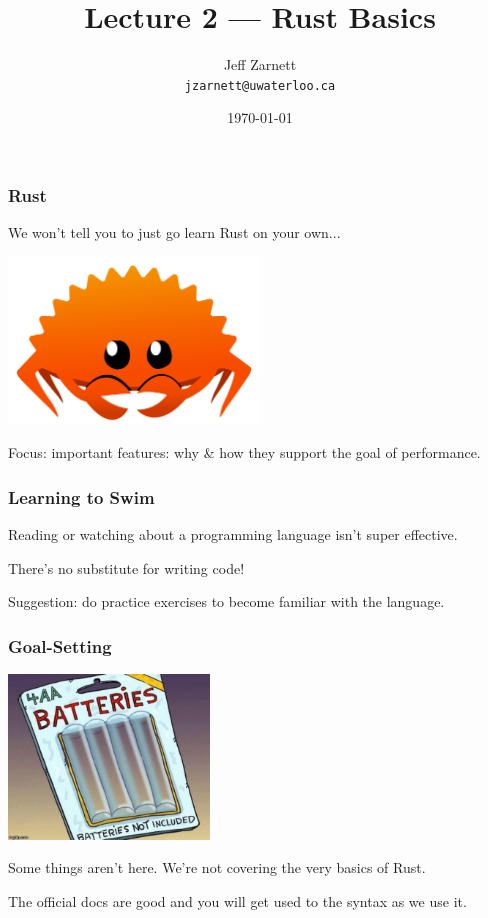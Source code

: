


\title{Lecture 2 --- Rust Basics }

\author{Jeff Zarnett \\ \small \texttt{jzarnett@uwaterloo.ca}}
\date{\today}




\begin{frame}
  \titlepage

 \end{frame}
 
 
\begin{frame}
\frametitle{Rust}

We won't tell you to just go learn Rust on your own...

\begin{center}
	\includegraphics[width=0.5\textwidth]{images/rustacean.png}
\end{center}

Focus: important features: why \& how they support the goal of performance.

\end{frame}


\begin{frame}
\frametitle{Learning to Swim}

Reading or watching about a programming language isn't super effective.

There's no substitute for writing code! 

Suggestion: do practice exercises to become familiar with the language.

\end{frame}


\begin{frame}
\frametitle{Goal-Setting}

\begin{center}
	\includegraphics[width=0.4\textwidth]{images/batteries.jpg}
\end{center}

Some things aren't here. We're not covering the very basics of Rust.

The official docs are good and you will get used to the syntax as we use it.

\end{frame}


